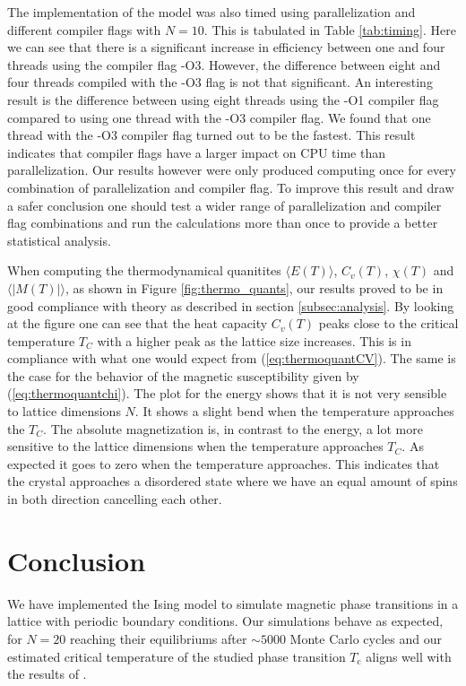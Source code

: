 \documentclass[twocolumn]{aastex62}
\begin{document}
The implementation of the model was also timed using parallelization and
different compiler flags with $N=10$. This is tabulated in Table \ref{tab:timing}. Here we
can see that there is a significant increase in efficiency between one and four
threads using the compiler flag -O3. However, the difference between eight and four
threads compiled with the -O3 flag is not that significant. An interesting
result is the difference between using eight threads using the -O1 compiler flag
compared to using one thread with the -O3 compiler flag. We found that one
thread with the -O3 compiler flag turned out to be the fastest. This result
indicates that compiler flags have a larger impact on CPU time than
parallelization. Our results however were only produced computing once for every
combination of parallelization and compiler flag. To improve this result and
draw a safer conclusion one should test a wider range of parallelization and
compiler flag combinations and run the calculations more than once to provide a
better statistical analysis.\\\indent

When computing the thermodynamical quanitites $\langle E(T) \rangle$,  $C_v(T)$,
$\chi(T)$ and $\langle \vert M(T) \vert \rangle$, as shown in Figure
\ref{fig:thermo_quants}, our results proved to be in good compliance with theory
as described in section \ref{subsec:analysis}. By looking at the figure one can
see that the heat capacity $C_v(T)$ peaks close to the critical temperature
$T_C$ with a higher peak as the lattice size increases. This is in compliance
with what one would expect from (\ref{eq:thermoquantCV}). The same is the case
for the behavior of the magnetic susceptibility given by
(\ref{eq:thermoquantchi}). The plot for the energy shows that it is not very sensible
to lattice dimensions $N$. It shows a slight bend when the temperature
approaches the $T_C$. The absolute magnetization is, in contrast to the energy,
a lot more sensitive to the lattice dimensions when the temperature approaches
$T_C$. As expected it goes to zero when the temperature approaches. This
indicates that the crystal approaches a disordered state where we have an equal
amount of spins in both direction cancelling each other.




\section{Conclusion} \label{sec:conclusion}
We have implemented the Ising model to simulate magnetic phase
transitions in a lattice with periodic boundary conditions. Our
simulations behave as expected, for $N=20$ reaching their equilibriums after
$\sim 5000$ Monte Carlo cycles and our estimated critical
temperature of the studied phase transition  $T_\text{c}$ aligns
well with the results of \cite{onsager:1944}.
\end{document}
